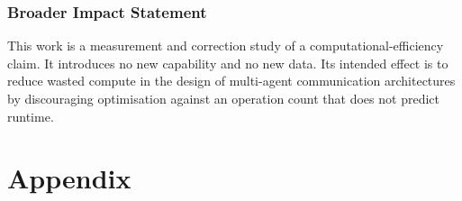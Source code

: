 \documentclass[10pt]{article} %
\begin{document}
\subsubsection*{Broader Impact Statement}
This work is a measurement and correction study of a computational-efficiency
claim. It introduces no new capability and no new data. Its intended effect is
to reduce wasted compute in the design of multi-agent communication
architectures by discouraging optimisation against an operation count that does
not predict runtime.




\appendix
\section{Appendix}

\end{document}

